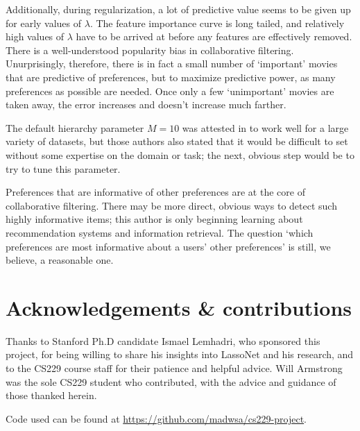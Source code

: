 \documentclass{article}
\begin{document}
Additionally, during regularization, a lot of predictive value seems to
be given up for early values of $\lambda$.  The feature importance curve
is long tailed, and relatively high values of $\lambda$ have to be
arrived at before any features are effectively removed. There is a
well-understood popularity bias in collaborative filtering.
Unurprisingly, therefore, there is in fact a small number of `important'
movies that are predictive of preferences, but to maximize predictive
power, as many preferences as possible are needed.  Once only a few
`unimportant' movies are taken away, the error increases and doesn't
increase much farther.

The default hierarchy parameter $M = 10$ was attested in
\cite{lemhadri_lassonet_2021} to work well for a large variety of
datasets, but those authors also stated that it would be difficult to set
without some expertise on the domain or task; the next, obvious step
would be to try to tune this parameter.

Preferences that are informative of other preferences are at the core of
collaborative filtering.  There may be more direct, obvious ways to
detect such highly informative items; this author is only beginning
learning about recommendation systems and information retrieval.  The
question `which preferences are most informative about a users' other
preferences' is still, we believe, a reasonable one.

\section{Acknowledgements \& contributions}

Thanks to Stanford Ph.D candidate Ismael Lemhadri, who sponsored this
project, for being willing to share his insights into LassoNet and his
research, and to the CS229 course staff for their patience and helpful
advice.  Will Armstrong was the sole CS229 student who contributed, with
the advice and guidance of those thanked herein.

Code used can be found at \url{https://github.com/madwsa/cs229-project}.



\end{document}
